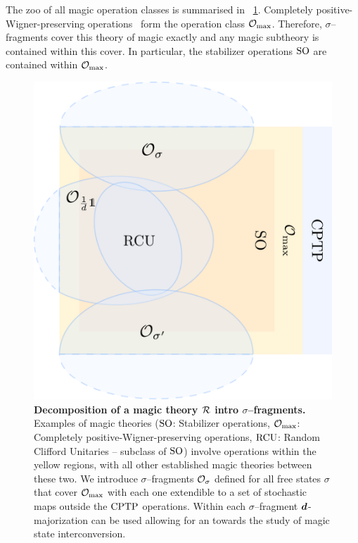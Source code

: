 \documentclass[pra,
aps,
twocolumn,
superscriptaddress,
groupedaddress,
nofootinbib,
reprint
]{revtex4-1}
\begin{document}
The zoo of all magic operation classes is summarised in ~\cref{fig:zoo}.
Completely positive-Wigner-preserving operations~\cite{cit:wang} form the operation class $\mathcal{O}_{\rm{}max}$.
Therefore, $\sigma$--fragments cover this theory of magic exactly and any magic subtheory is contained within this cover.
In particular, the stabilizer operations ${\rm{SO}}$ are contained within $\mathcal{O}_{\rm{}max}$.
\begin{figure}[t]
    \centering
        \includegraphics[scale=0.47
        ]{figs/operations.pdf}
    \caption{\textbf{Decomposition of a magic theory $\mathcal{R}$ intro $\sigma$--fragments.} 
    Examples of magic theories (${\rm{SO}}$: Stabilizer operations, $\mathcal{O}_{\rm{}max}$: Completely positive-Wigner-preserving operations, ${\rm{RCU}}$: Random Clifford Unitaries -- subclass of ${\rm{SO}}$) involve operations within the yellow regions, with all other established magic theories between these two.
    We introduce $\sigma$--fragments $\mathcal{O}_\sigma$ defined for all free states $\sigma$ that cover $\mathcal{O}_{\rm{}max}$ with each one extendible to a set of stochastic maps outside the ${\rm{CPTP}}$ operations.
    Within each $\sigma$--fragment $\bm{d}$-majorization can be used allowing for an  towards the study of magic state interconversion.
    }
    \label{fig:zoo}
\end{figure}
\end{document}
